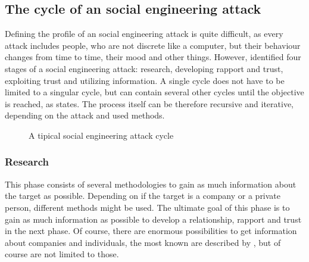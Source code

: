 \subsection{The cycle of an social engineering attack}

Defining the profile of an social engineering attack is quite difficult, as
every attack includes people, who are not discrete like a computer, but their
behaviour changes from time to time, their mood and other things. However,
\cite{mitnick2003} identified four stages of a social engineering attack:
research, developing rapport and trust, exploiting trust and utilizing
information. A single cycle does not have to be limited to a singular cycle, but
can contain several other cycles until the objective is reached, as
\cite{thornburgh2004} states. The process itself can be therefore recursive and
iterative, depending on the attack and used methods.

\begin{figure}
  \begin{center}

    \caption{A tipical social engineering attack cycle}
  \end{center}
\end{figure}

\subsubsection{Research}

This phase consists of several methodologies to gain as much information about
the target as possible. Depending on if the target is a company or a
private person, different methods might be used. The ultimate goal of this
phase is to gain as much information as possible to develop a relationship,
rapport and trust in the next phase. Of course, there are enormous
possibilities to get information about companies and individuals, the most
known are described by \cite{jones2004,mitnick2003,thornburgh2004}, but of
course are not limited to those.

